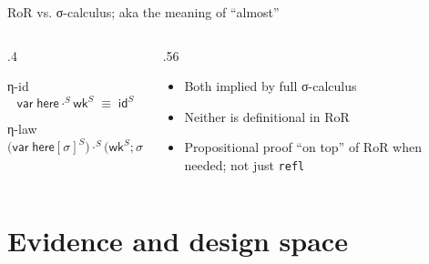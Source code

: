 \documentclass[pdftex,aspectratio=169]{beamer}
\newcommand{\refl}{\texttt{refl}}
\begin{document}
\begin{frame}{RoR vs. σ-calculus; aka the meaning of ``almost''}
  \begin{columns}[T,onlytextwidth]
    \begin{column}{.4\textwidth}
      \begin{block}{η-id}
        \[
          \mathsf{var}\;\mathsf{here} \mathbin{\cdot^S} \mathsf{wk}^S
          \;\equiv\; \mathsf{id}^S
        \]
      \end{block}
      \begin{block}{η-law}
        \vspace{-\baselineskip}
        \[
          \bigl(\mathsf{var}\;\mathsf{here}[\sigma]^S\bigr)
          \mathbin{\cdot^S}
          \bigl(\mathsf{wk}^S\mathbin{;}\sigma\bigr)
          \;\equiv\; \sigma
        \]
      \end{block}
    \end{column}
    \begin{column}{.56\textwidth}
      \begin{itemize}
        \item Both implied by full σ-calculus
        \item Neither is definitional in RoR
        \item Propositional proof ``on top'' of RoR when needed; not just \refl{}
      \end{itemize}
    \end{column}
  \end{columns}

\end{frame}

\section{Evidence and design space}
\end{document}
